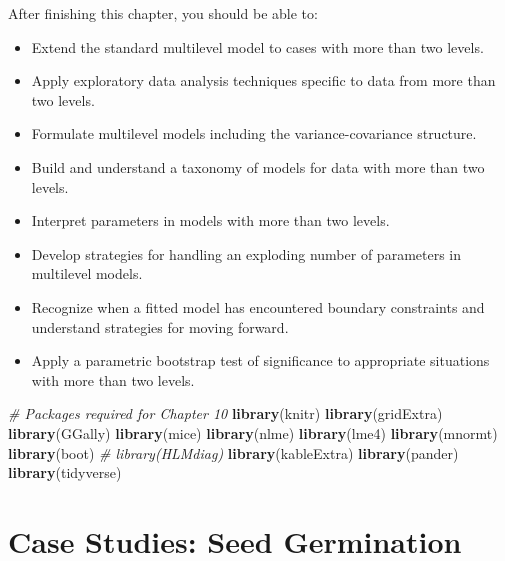\documentclass[
]{krantz}
\newenvironment{Shaded}{\begin{snugshade}}{\end{snugshade}}
\newcommand{\CommentTok}[1]{\textcolor[rgb]{0.37,0.37,0.37}{\textit{#1}}}
\newcommand{\FunctionTok}[1]{\textcolor[rgb]{0.27,0.27,0.27}{\textbf{#1}}}
\newcommand{\NormalTok}[1]{#1}
\providecommand{\tightlist}{%
  \setlength{\itemsep}{0pt}\setlength{\parskip}{0pt}}
\begin{document}
After finishing this chapter, you should be able to:

\begin{itemize}
\tightlist
\item
  Extend the standard multilevel model to cases with more than two levels.
\item
  Apply exploratory data analysis techniques specific to data from more than two levels.
\item
  Formulate multilevel models including the variance-covariance structure.
\item
  Build and understand a taxonomy of models for data with more than two levels.
\item
  Interpret parameters in models with more than two levels.
\item
  Develop strategies for handling an exploding number of parameters in multilevel models.
\item
  Recognize when a fitted model has encountered boundary constraints and understand strategies for moving forward.
\item
  Apply a parametric bootstrap test of significance to appropriate situations with more than two levels.
\end{itemize}

\begin{Shaded}
\begin{Highlighting}[]
\CommentTok{\# Packages required for Chapter 10}
\FunctionTok{library}\NormalTok{(knitr)}
\FunctionTok{library}\NormalTok{(gridExtra)}
\FunctionTok{library}\NormalTok{(GGally)}
\FunctionTok{library}\NormalTok{(mice)}
\FunctionTok{library}\NormalTok{(nlme)}
\FunctionTok{library}\NormalTok{(lme4)}
\FunctionTok{library}\NormalTok{(mnormt)}
\FunctionTok{library}\NormalTok{(boot)}
\CommentTok{\# library(HLMdiag)}
\FunctionTok{library}\NormalTok{(kableExtra)}
\FunctionTok{library}\NormalTok{(pander)}
\FunctionTok{library}\NormalTok{(tidyverse)}
\end{Highlighting}
\end{Shaded}

\section{Case Studies: Seed Germination}\label{cs:seeds}
\end{document}
